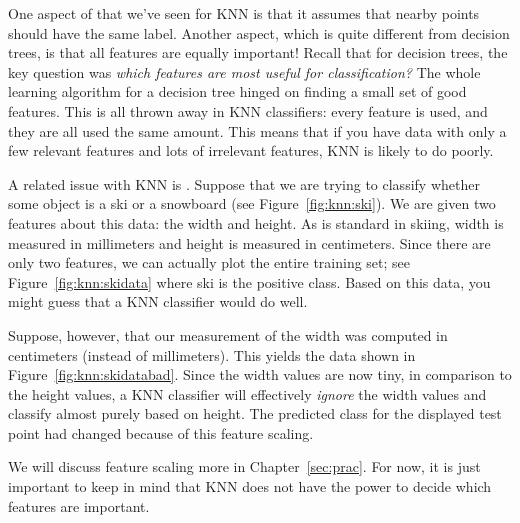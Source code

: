 \MoveNextFigure{-7cm}

One aspect of  that we've seen for KNN is that
it assumes that nearby points should have the same label.  Another
aspect, which is quite different from decision trees, is that all
features are equally important!  Recall that for decision trees, the
key question was \emph{which features are most useful for
  classification?}  The whole learning algorithm for a decision tree
hinged on finding a small set of good features.  This is all thrown
away in KNN classifiers: every feature is used, and they are all used
the same amount.  This means that if you have data with only a few
relevant features and lots of irrelevant features, KNN is likely to do
poorly.

A related issue with KNN is .  Suppose that we
are trying to classify whether some object is a ski or a snowboard
(see Figure~\ref{fig:knn:ski}).  We are given two features about this
data: the width and height.  As is standard in skiing, width is
measured in millimeters and height is measured in centimeters.  Since
there are only two features, we can actually plot the entire training
set; see Figure~\ref{fig:knn:skidata} where ski is the positive class.
Based on this data, you might guess that a KNN classifier would do
well.

Suppose, however, that our measurement of the width was computed in
centimeters (instead of millimeters).  This yields the data shown in
Figure~\ref{fig:knn:skidatabad}.  Since the width values are now tiny,
in comparison to the height values, a KNN classifier will effectively
\emph{ignore} the width values and classify almost purely based on
height.  The predicted class for the displayed test point had changed
because of this feature scaling.

We will discuss feature scaling more in Chapter~\ref{sec:prac}.  For
now, it is just important to keep in mind that KNN does not have the
power to decide which features are important.

